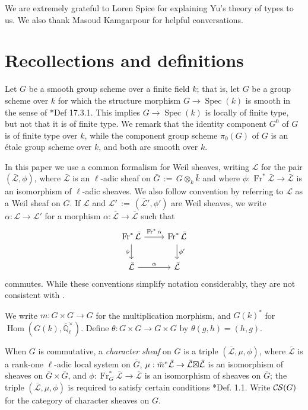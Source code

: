 \documentclass[10pt]{amsart}
\theoremstyle{plain}
\theoremstyle{definition}
\newcommand{\EE}{\mathbb{\bar Q}_\ell}
\newcommand{\bFq}{\bar{k}}
\newcommand{\Fq}{k}
\newcommand{\EEx}{\EE^\times}
\newcommand{\Frob}[1]{\operatorname{Fr}_{#1}}
\DeclareMathOperator{\Hom}{Hom}
\newcommand{\Spec}[1]{{\operatorname{Spec}(#1)}}
\newcommand{\ceq}{{\, :=\, }}
\newcommand{\cs}[1]{{\mathcal{#1}}}
\newcommand{\gcs}[1]{{\mathcal{\bar #1}}}
\newcommand{\CS}{{\mathcal{C\hskip-0.8pt S}}}
\newcommand{\bm}{\bar{m}}
\newcommand{\bG}{\bar{G}}
\newcommand{\tight}[3]{\hspace{-#1pt}{#2}\hspace{-#3pt}}
\newcommand{\LxL}{\text{$\gcs{L} \tight{0}{\boxtimes}{0} \gcs{L}$}}
\begin{document}
We are extremely grateful to Loren Spice for explaining Yu's theory of types to us.
We also thank Masoud Kamgarpour for helpful conversations.

\section{Recollections and definitions} \label{sec:defs}

Let $G$ be a smooth group scheme over a finite field $\Fq$; that is, let $G$ be a group scheme over $\Fq$
for which the structure morphism $G \to \Spec{\Fq}$ is smooth in the sense of \cite{EGAIV4}*{Def 17.3.1}.
This implies $G \to \Spec{\Fq}$ is locally of finite type, but not that it is of finite type.
We remark that the identity component $G^0$ of $G$ is of finite type over $\Fq$, while the component group scheme
$\pi_0(G)$ of $G$ is an \'etale group scheme over $\Fq$, and both are smooth over $\Fq$.

In this paper we use a common formalism for Weil sheaves, writing $\cs{L}$ for the pair $(\gcs{L},\phi)$, where $\gcs{L}$ is an $\ell$-adic sheaf on $\bG \ceq G\otimes_{\Fq} \bFq$ and where $\phi : \Frob{}^*\gcs{L} \to \gcs{L}$ is an isomorphism of $\ell$-adic sheaves. 
We also follow convention by referring to $\cs{L}$  as a Weil sheaf on $G$. 
If $\cs{L}$ and $\cs{L}' \ceq (\gcs{L}', \phi')$ are Weil sheaves, we write $\alpha : \cs{L} \to \cs{L}'$ for a morphism $\alpha : \gcs{L} \to \gcs{L}$ such that 
\[
\begin{tikzcd}
\Frob{}^* \gcs{L} \arrow{d}[swap]{\phi} \arrow{r}{\Frob{}^*\alpha} &  \Frob{}^* \gcs{L} \arrow{d}{\phi'}\\
\gcs{L} \arrow{r}{\alpha} & \gcs{L}
\end{tikzcd}
\]
commutes.  While these conventions simplify notation considerably, they are not consistent with \cite{cunningham-roe:13a}.

We write $m : G \times G \to G$ for the multiplication morphism, and $G(k)^*$ for $\Hom(G(k), \EEx)$.
Define $\theta : G\times G \to G\times G$ by $\theta(g,h) = (h,g)$.

When $G$ is commutative, a \emph{character sheaf} on $G$ is a triple $(\gcs{L}, \mu, \phi)$,
where $\gcs{L}$ is a rank-one $\ell$-adic local system on $\bG$, 
$\mu : \bm^* \gcs{L} \to \LxL$ is an isomorphism
of sheaves on $\bG \times \bG$, 
and $\phi : \Frob{G}^* \gcs{L} \to \gcs{L}$ is an isomorphism of sheaves on $\bG$;
the triple $(\gcs{L}, \mu, \phi)$ is required to satisfy certain conditions \cite{cunningham-roe:13a}*{Def. 1.1}.
Write $\CS(G)$ for the category of character sheaves on $G$.
\end{document}
